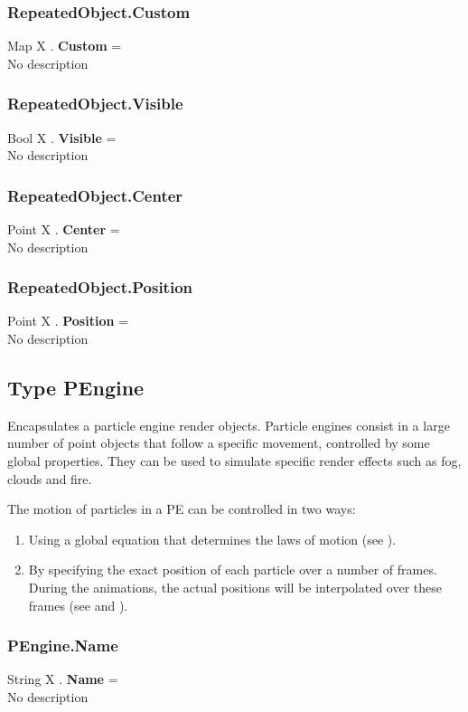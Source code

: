 \subsubsection{RepeatedObject.Custom \label{F:RepeatedObject:Custom}}
Map X . \textbf{Custom} = \\
No description

\subsubsection{RepeatedObject.Visible \label{F:RepeatedObject:Visible}}
Bool X . \textbf{Visible} = \\
No description

\subsubsection{RepeatedObject.Center \label{F:RepeatedObject:Center}}
Point X . \textbf{Center} = \\
No description

\subsubsection{RepeatedObject.Position \label{F:RepeatedObject:Position}}
Point X . \textbf{Position} = \\
No description

\subsection{Type PEngine \label{T:PEngine}}
Encapsulates a particle engine render objects. Particle engines consist in a large number of point objects that follow a specific movement, controlled by some global properties. They can be used to simulate specific render effects such as fog, clouds and fire.

The motion of particles in a PE can be controlled in two ways:
\begin{enumerate}
\item
Using a global equation that determines the laws of motion (see ).
\item
By specifying the exact position of each particle over a number of frames. During the animations, the actual positions will be interpolated over these frames (see  and ).
\end{enumerate}

\subsubsection{PEngine.Name \label{F:PEngine:Name}}
String X . \textbf{Name} = \\
No description

